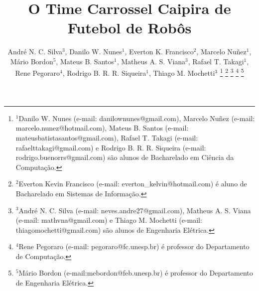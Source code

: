 \title{\LARGE \bf
O Time Carrossel Caipira de Futebol de Robôs
}

%
\author{{\centering André N. C. Silva$^{3}$, Danilo W. Nunes$^{1}$, Everton K. Francisco$^{2}$, Marcelo Nuñez$^{1}$, Mário Bordon$^{5}$,}%
{\authorblockN \centering Mateus B. Santos$^{1}$, Matheus A. S. Viana$^{3}$, Rafael T. Takagi$^{1}$, Rene Pegoraro$^{4}$, Rodrigo B. R. R. Siqueira$^{1}$,}%
{\authorblockN \centering Thiago M. Mochetti$^{3}$}%
%
\thanks{$^{1}$Danilo W. Nunes (e-mail: danilownunes@gmail.com), Marcelo Nuñez (e-mail: marcelo.nunez@hotmail.com), Mateus B. Santos (e-mail: mateusbatistasantos@gmail.com), Rafael T. Takagi (e-mail: rafaelttakagi@gmail.com) e Rodrigo B. R. R. Siqueira (e-mail: rodrigo.buenorrs@gmail.com) são alunos de Bacharelado em Ciência da Computação.}
\thanks{$^{2}$Everton Kevin Francisco (e-mail: everton\_kelvin@hotmail.com) é aluno de Bacharelado em Sistemas de Informação.}
\thanks{$^{3}$André N. C. Silva (e-mail: neves.andre27@gmail.com), Matheus A. S. Viana (e-mail: mathvna@gmail.com) e Thiago M. Mochetti (e-mail: thiagomochetti@gmail.com) são alunos de Engenharia Elétrica.}
\thanks{$^{4}$Rene Pegoraro (e-mail: pegoraro@fc.unesp.br) é professor do Departamento de Computação.}
\thanks{$^{5}$Mário Bordon (e-mail:mebordon@feb.unesp.br) é professor do Departamento de Engenharia Elétrica.}
}
